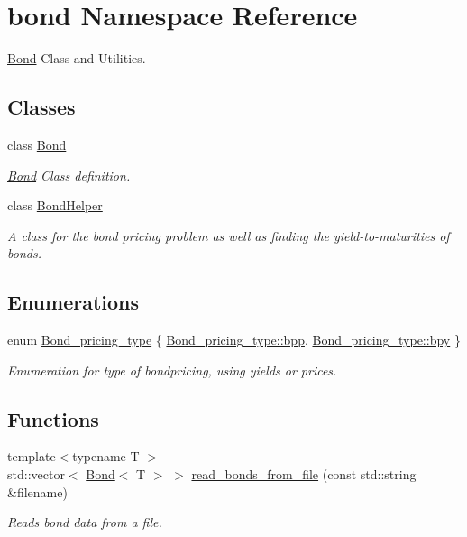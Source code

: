 \hypertarget{namespacebond}{}\section{bond Namespace Reference}
\label{namespacebond}


\hyperlink{classbond_1_1_bond}{Bond} Class and Utilities.  


\subsection*{Classes}
\begin{DoxyCompactItemize}
\item 
class \hyperlink{classbond_1_1_bond}{Bond}
\begin{DoxyCompactList}\small\item\em \hyperlink{classbond_1_1_bond}{Bond} Class definition. \end{DoxyCompactList}\item 
class \hyperlink{classbond_1_1_bond_helper}{Bond\+Helper}
\begin{DoxyCompactList}\small\item\em A class for the bond pricing problem as well as finding the yield-\/to-\/maturities of bonds. \end{DoxyCompactList}\end{DoxyCompactItemize}
\subsection*{Enumerations}
\begin{DoxyCompactItemize}
\item 
enum \hyperlink{namespacebond_a7ff8132c72465682a65a634ca0958df9}{Bond\+\_\+pricing\+\_\+type} \{ \hyperlink{namespacebond_a7ff8132c72465682a65a634ca0958df9a0c68c2daa0334704116676287d54c2ae}{Bond\+\_\+pricing\+\_\+type\+::bpp}, 
\hyperlink{namespacebond_a7ff8132c72465682a65a634ca0958df9afebbcc7d14e1ada7b0eee6411e82665b}{Bond\+\_\+pricing\+\_\+type\+::bpy}
 \}\begin{DoxyCompactList}\small\item\em Enumeration for type of bondpricing, using yields or prices. \end{DoxyCompactList}
\end{DoxyCompactItemize}
\subsection*{Functions}
\begin{DoxyCompactItemize}
\item 
{\footnotesize template$<$typename T $>$ }\\std\+::vector$<$ \hyperlink{classbond_1_1_bond}{Bond}$<$ T $>$ $>$ \hyperlink{namespacebond_a20b23f0d31139a065334fd997507b1ae}{read\+\_\+bonds\+\_\+from\+\_\+file} (const std\+::string \&filename)
\begin{DoxyCompactList}\small\item\em Reads bond data from a file. \end{DoxyCompactList}\end{DoxyCompactItemize}


